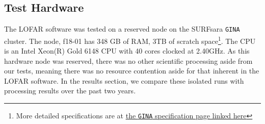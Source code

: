 \subsection{Test Hardware}\label{sec:hardware}

The LOFAR software was tested on a reserved node on the SURFsara \texttt{GINA} cluster. The node, f18-01 has 348 GB of RAM, 3TB of scratch space\footnote{More detailed specifications are at \href{http://docs.surfsaralabs.nl/projects/grid/en/latest/Pages/Service/system_specifications/gina_specs.html}{the \texttt{GINA} specification page linked here}}. The CPU is an Intel Xeon(R) Gold 6148 CPU with 40 cores clocked at 2.40GHz.  As this hardware node was reserved, there was no other scientific processing aside from our tests, meaning there was no resource contention aside for that inherent in the LOFAR software. In the results section, we compare these isolated runs with processing results over the past two years. 